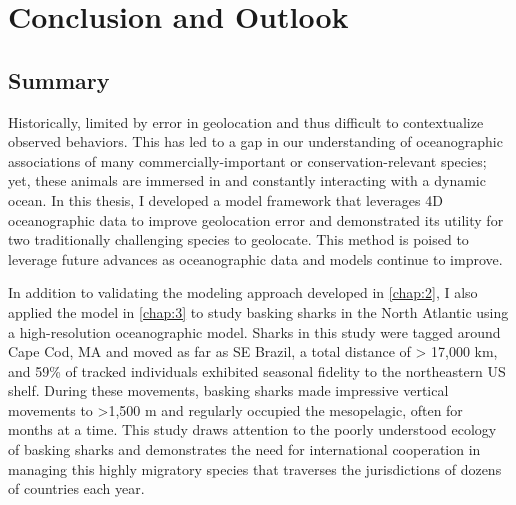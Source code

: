 \chapter{Conclusion and Outlook}
\label{chap:6}
\clearpage
\raggedbottom






\section{Summary}

Historically, limited by error in geolocation and thus difficult to contextualize observed behaviors. This has led to a gap in our understanding of oceanographic associations of many commercially-important or conservation-relevant species; yet, these animals are immersed in and constantly interacting with a dynamic ocean. In this thesis, I developed a model framework that leverages 4D oceanographic data to improve geolocation error and demonstrated its utility for two traditionally challenging species to geolocate. This method is poised to leverage future advances as oceanographic data and models continue to improve.

In addition to validating the modeling approach developed in \cref{chap:2}, I also applied the model in \cref{chap:3} to study basking sharks in the North Atlantic using a high-resolution oceanographic model. Sharks in this study were tagged around Cape Cod, MA and moved as far as SE Brazil, a total distance of > 17,000 km, and 59\% of tracked individuals exhibited seasonal fidelity to the northeastern US shelf. During these movements, basking sharks made impressive vertical movements to >1,500 m and regularly occupied the mesopelagic, often for months at a time. This study draws attention to the poorly understood ecology of basking sharks and demonstrates the need for international cooperation in managing this highly migratory species that traverses the jurisdictions of dozens of countries each year.


